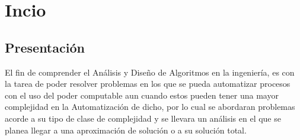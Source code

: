 \documentclass[10pt,executivepaper]{article}
\begin{document}
\begin{center}
	\par{}
	\par{}
	\par{}
	\par\vspace{2cm}{
		Ultima fecha modificado: \today
	}
\end{center}

\clearpage
\tableofcontents
\clearpage

\section{Incio}
\subsection{Presentación}
El fin de comprender el Análisis y Diseño de Algoritmos en la ingeniería, es con la tarea de poder resolver problemas en los que se pueda automatizar procesos con el uso del poder computable aun cuando estos pueden tener una mayor complejidad en la Automatización de dicho, por lo cual se abordaran problemas acorde a su tipo de clase de complejidad y se llevara un análisis en el que se planea llegar a una aproximación de solución o a su solución total.
\end{document}
